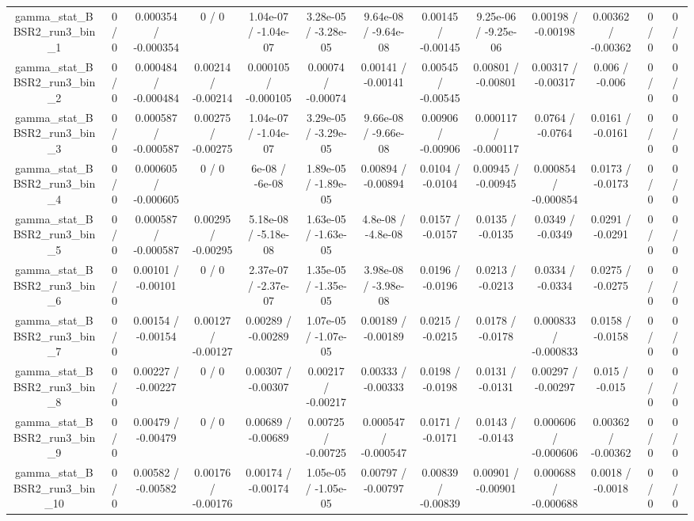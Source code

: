 \documentclass[10pt]{article}
\begin{document}
\begin{table}[htbp]
\begin{center}
\begin{tabular}{|c|c|c|c|c|c|c|c|c|c|c|c|c|}
  gamma_stat_BBSR2_run3_bin_1 & 0 / 0 & 0.000354 / -0.000354 & 0 / 0 & 1.04e-07 / -1.04e-07 & 3.28e-05 / -3.28e-05 & 9.64e-08 / -9.64e-08 & 0.00145 / -0.00145 & 9.25e-06 / -9.25e-06 & 0.00198 / -0.00198 & 0.00362 / -0.00362 & 0 / 0 & 0 / 0 \\ 
  gamma_stat_BBSR2_run3_bin_2 & 0 / 0 & 0.000484 / -0.000484 & 0.00214 / -0.00214 & 0.000105 / -0.000105 & 0.00074 / -0.00074 & 0.00141 / -0.00141 & 0.00545 / -0.00545 & 0.00801 / -0.00801 & 0.00317 / -0.00317 & 0.006 / -0.006 & 0 / 0 & 0 / 0 \\ 
  gamma_stat_BBSR2_run3_bin_3 & 0 / 0 & 0.000587 / -0.000587 & 0.00275 / -0.00275 & 1.04e-07 / -1.04e-07 & 3.29e-05 / -3.29e-05 & 9.66e-08 / -9.66e-08 & 0.00906 / -0.00906 & 0.000117 / -0.000117 & 0.0764 / -0.0764 & 0.0161 / -0.0161 & 0 / 0 & 0 / 0 \\ 
  gamma_stat_BBSR2_run3_bin_4 & 0 / 0 & 0.000605 / -0.000605 & 0 / 0 & 6e-08 / -6e-08 & 1.89e-05 / -1.89e-05 & 0.00894 / -0.00894 & 0.0104 / -0.0104 & 0.00945 / -0.00945 & 0.000854 / -0.000854 & 0.0173 / -0.0173 & 0 / 0 & 0 / 0 \\ 
  gamma_stat_BBSR2_run3_bin_5 & 0 / 0 & 0.000587 / -0.000587 & 0.00295 / -0.00295 & 5.18e-08 / -5.18e-08 & 1.63e-05 / -1.63e-05 & 4.8e-08 / -4.8e-08 & 0.0157 / -0.0157 & 0.0135 / -0.0135 & 0.0349 / -0.0349 & 0.0291 / -0.0291 & 0 / 0 & 0 / 0 \\ 
  gamma_stat_BBSR2_run3_bin_6 & 0 / 0 & 0.00101 / -0.00101 & 0 / 0 & 2.37e-07 / -2.37e-07 & 1.35e-05 / -1.35e-05 & 3.98e-08 / -3.98e-08 & 0.0196 / -0.0196 & 0.0213 / -0.0213 & 0.0334 / -0.0334 & 0.0275 / -0.0275 & 0 / 0 & 0 / 0 \\ 
  gamma_stat_BBSR2_run3_bin_7 & 0 / 0 & 0.00154 / -0.00154 & 0.00127 / -0.00127 & 0.00289 / -0.00289 & 1.07e-05 / -1.07e-05 & 0.00189 / -0.00189 & 0.0215 / -0.0215 & 0.0178 / -0.0178 & 0.000833 / -0.000833 & 0.0158 / -0.0158 & 0 / 0 & 0 / 0 \\ 
  gamma_stat_BBSR2_run3_bin_8 & 0 / 0 & 0.00227 / -0.00227 & 0 / 0 & 0.00307 / -0.00307 & 0.00217 / -0.00217 & 0.00333 / -0.00333 & 0.0198 / -0.0198 & 0.0131 / -0.0131 & 0.00297 / -0.00297 & 0.015 / -0.015 & 0 / 0 & 0 / 0 \\ 
  gamma_stat_BBSR2_run3_bin_9 & 0 / 0 & 0.00479 / -0.00479 & 0 / 0 & 0.00689 / -0.00689 & 0.00725 / -0.00725 & 0.000547 / -0.000547 & 0.0171 / -0.0171 & 0.0143 / -0.0143 & 0.000606 / -0.000606 & 0.00362 / -0.00362 & 0 / 0 & 0 / 0 \\ 
  gamma_stat_BBSR2_run3_bin_10 & 0 / 0 & 0.00582 / -0.00582 & 0.00176 / -0.00176 & 0.00174 / -0.00174 & 1.05e-05 / -1.05e-05 & 0.00797 / -0.00797 & 0.00839 / -0.00839 & 0.00901 / -0.00901 & 0.000688 / -0.000688 & 0.0018 / -0.0018 & 0 / 0 & 0 / 0 \\ 

\end{tabular}
\end{center}
\end{table}
\end{document}
